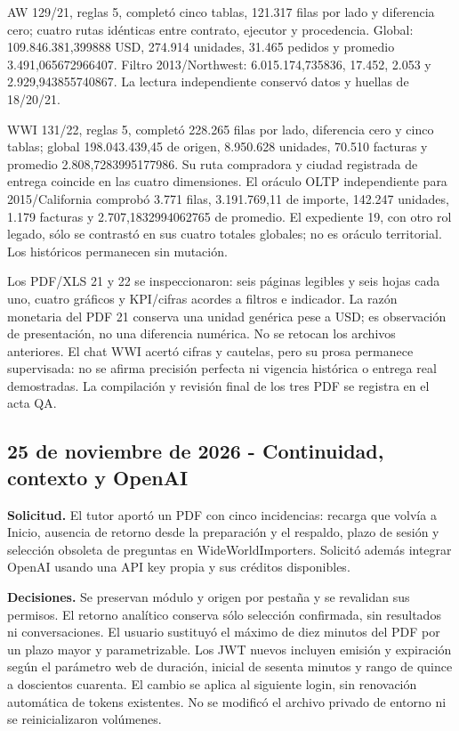 \documentclass[11pt,letterpaper]{article}
\begin{document}
AW 129/21, reglas 5, completó cinco tablas, 121.317 filas por lado y diferencia
cero; cuatro rutas idénticas entre contrato, ejecutor y procedencia. Global:
109.846.381,399888 USD, 274.914 unidades, 31.465 pedidos y promedio 3.491,065672966407.
Filtro 2013/Northwest: 6.015.174,735836, 17.452, 2.053 y 2.929,943855740867.
La lectura independiente conservó datos y huellas de 18/20/21.

WWI 131/22, reglas 5, completó 228.265 filas por lado, diferencia cero y cinco
tablas; global 198.043.439,45 de origen, 8.950.628 unidades, 70.510 facturas y
promedio 2.808,7283995177986. Su ruta compradora y ciudad registrada de entrega
coincide en las cuatro dimensiones. El oráculo OLTP independiente para
2015/California comprobó 3.771 filas, 3.191.769,11 de importe, 142.247 unidades,
1.179 facturas y 2.707,1832994062765 de promedio. El expediente 19, con otro rol
legado, sólo se contrastó en sus cuatro totales globales; no es oráculo territorial.
Los históricos permanecen sin mutación.

Los PDF/XLS 21 y 22 se inspeccionaron: seis páginas legibles y seis hojas cada
uno, cuatro gráficos y KPI/cifras acordes a filtros e indicador. La razón monetaria
del PDF 21 conserva una unidad genérica pese a USD; es observación de presentación,
no una diferencia numérica. No se retocan los archivos anteriores. El chat WWI
acertó cifras y cautelas, pero su prosa permanece supervisada: no se afirma
precisión perfecta ni vigencia histórica o entrega real demostradas.
La compilación y revisión final de los tres PDF se registra en el acta QA.


\subsection{25 de noviembre de 2026 - Continuidad, contexto y OpenAI}

\textbf{Solicitud.} El tutor aportó un PDF con cinco incidencias: recarga que
volvía a Inicio, ausencia de retorno desde la preparación y el respaldo, plazo de
sesión y selección obsoleta de preguntas en WideWorldImporters. Solicitó además
integrar OpenAI usando una API key propia y sus créditos disponibles.

\textbf{Decisiones.} Se preservan módulo y origen por pestaña y se revalidan sus
permisos. El retorno analítico conserva sólo selección confirmada, sin resultados
ni conversaciones. El usuario sustituyó el máximo de diez minutos del PDF por un plazo mayor
y parametrizable. Los JWT nuevos incluyen emisión y expiración según el parámetro
web de duración, inicial de sesenta minutos y rango de quince a doscientos cuarenta.
El cambio se aplica al siguiente login, sin renovación automática de tokens existentes. No se
modificó el archivo privado de entorno ni se reinicializaron volúmenes.
\end{document}

